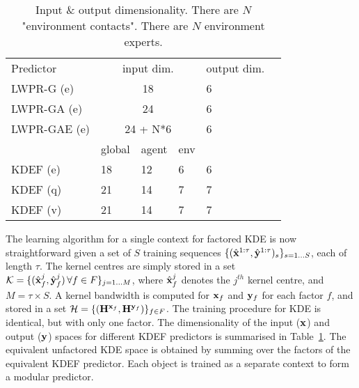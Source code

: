 \begin{table}[t]
\begin{center}
\begin{tabular}{|l|l|l|l|l|l|}
\cline{1-5}
Predictor & \multicolumn{3}{|c|}{input dim. } & output dim. \\ 
\cline{1-5} 
LWPR-G (e) & \multicolumn{3}{|c|}{18} & 6 \\
LWPR-GA (e) & \multicolumn{3}{|c|}{24} & 6 \\
LWPR-GAE (e) & \multicolumn{3}{|c|}{24 + N*6} & 6 \\
\cline{1-5}
\cline{2-4}
 & global & agent & env & \\
\cline{1-5}
KDEF (e) & 18 & 12 & 6 & 6 \\
KDEF (q) & 21 & 14 & 7 & 7 \\
KDEF (v) & 21 & 14 & 7 & 7 \\
\cline{1-5}
\end{tabular}
\caption[Input/output space]{Input \& output dimensionality. There are $N$ "environment contacts". There are $N$ environment experts.}\label{tab:InpOutSpace}
\end{center}
\end{table}
The learning algorithm for a single context for factored KDE is now straightforward given a set of $S$ training sequences $\{ (\hat{\mathbf{x}}^{1:\tau} , \hat{\mathbf{y}}^{1:\tau})_s \}_{s = 1 \ldots S}$, each of length $\tau$. The kernel centres are simply stored in a set $\mathcal{K} = \{ ( \hat{\mathbf{x}}^j_f ,  \hat{\mathbf{y}}^j_f ) \, \forall f \in F \}_{ j = 1 \ldots M}$, where $\hat{\mathbf{x}}^j_f$ denotes the $j^{th}$ kernel centre, and $M= \tau \times S$. A kernel bandwidth is computed for $\mathbf{x}_f$ and $\mathbf{y}_f$ for each factor $f$, and stored in a set $\mathcal{H} = \{ (\mathbf{H}^{\mathbf{x}_f},  \mathbf{H}^{\mathbf{y}_f} ) \}_{f \in F}$. The training procedure for KDE is identical, but with only one factor. The dimensionality of the input ($\mathbf{x}$) and output ($\mathbf{y}$) spaces for different KDEF predictors is summarised in Table~\ref{tab:InpOutSpace}. The equivalent unfactored KDE space is obtained by summing over the factors of the equivalent KDEF predictor. Each object is trained as a separate context to form a modular predictor.
